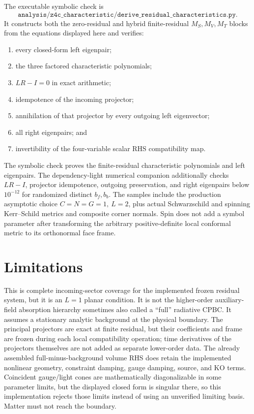 \documentclass[11pt]{article}
\begin{document}
The executable symbolic check is
\[
\texttt{analysis/z4c\_characteristic/derive\_residual\_characteristics.py}.
\]
It constructs both the zero-residual and hybrid finite-residual
\(M_S,M_V,M_T\) blocks from the equations displayed here and verifies:
\begin{enumerate}
 \item every closed-form left eigenpair;
 \item the three factored characteristic polynomials;
 \item \(LR-I=0\) in exact arithmetic;
 \item idempotence of the incoming projector;
 \item annihilation of that projector by every outgoing left eigenvector;
 \item all right eigenpairs; and
 \item invertibility of the four-variable scalar RHS compatibility map.
\end{enumerate}
The symbolic check proves the finite-residual characteristic polynomials and
left eigenpairs.  The dependency-light numerical companion additionally
checks \(LR-I\), projector idempotence, outgoing preservation, and right
eigenpairs below \(10^{-12}\) for randomized distinct \(b_f,b_b\).  The
samples include the production asymptotic choice \(C=N=G=1,\ L=2\), plus
actual Schwarzschild and spinning Kerr--Schild metrics and composite corner
normals.  Spin does not add a symbol parameter after transforming the
arbitrary positive-definite local conformal metric to its orthonormal face
frame.

\section{Limitations}

This is complete incoming-sector coverage for the implemented frozen residual
system, but it is an \(L=1\) planar condition.  It is not the higher-order
auxiliary-field absorption hierarchy sometimes also called a ``full''
radiative CPBC.  It assumes a stationary analytic background at the physical
boundary.  The principal projectors are exact at finite residual, but their
coefficients and frame are frozen during each local compatibility operation;
time derivatives of the projectors themselves are not added as separate
lower-order data.  The already assembled full-minus-background volume RHS
does retain the implemented nonlinear geometry, constraint damping, gauge
damping, source, and KO terms.  Coincident gauge/light cones are
mathematically diagonalizable in some parameter limits, but the displayed
closed form is singular there, so this implementation rejects those limits
instead of using an unverified limiting basis.  Matter must not reach the
boundary.
\end{document}
